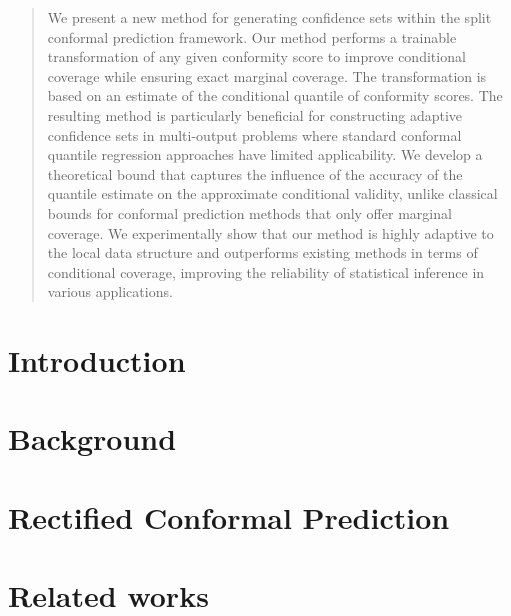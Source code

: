 \documentclass{article}
\begin{document}


\begin{abstract}
  We present a new method for generating confidence sets within the split conformal prediction framework. Our method performs a trainable transformation of any given conformity score to improve conditional coverage while ensuring exact marginal coverage. The transformation is based on an estimate of the conditional quantile of conformity scores. The resulting method is particularly beneficial for constructing adaptive confidence sets in multi-output problems where standard conformal quantile regression approaches have limited applicability. We develop a theoretical bound that captures the influence of the accuracy of the quantile estimate on the approximate conditional validity, unlike classical bounds for conformal prediction methods that only offer marginal coverage. We experimentally show that our method is highly adaptive to the local data structure and outperforms existing methods in terms of conditional coverage, improving the reliability of statistical inference in various applications.
\end{abstract}

\vspace{-20pt}

\section{Introduction}
\label{sec:introduction}

\vspace{-10pt}

  

\vspace{-20pt}

\section{Background}
\label{sec:ccp}

\vspace{-10pt}

  

\section{Rectified Conformal Prediction}
  

\vspace{-15pt}
\section{Related works}
\label{sec:cr-literature}
  
\end{document}

